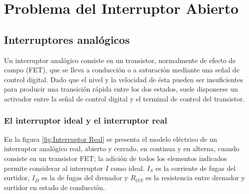 \chapter{Problema del Interruptor Abierto}

\section{Interruptores analógicos}

Un interruptor analógico consiste en un transistor, normalmente de efecto de campo (FET), que se lleva a conducción o a saturación mediante una señal de control digital. Dado que el nivel y la velocidad de ésta pueden ser insuficientes para producir una transición rápida entre los dos estados, suele disponerse un activador entre la señal de control digital y el terminal de control del transistor.

\subsection{El interruptor ideal y el interruptor real}

En la figura \ref{fig:Interruptor Real} se presenta el modelo eléctrico de un interruptor analógico real, abierto y cerrado, en continua y en alterna, cuando consiste en un transistor FET; la adición de todos los elementos indicados permite considerar al interruptor $I$ como ideal. $I_S$ es la corriente de fugas del surtidor, $I_D$ es la de fugas del drenador y $R_{ON}$ es la resistencia entre drenador y surtidor en estado de conducción.

